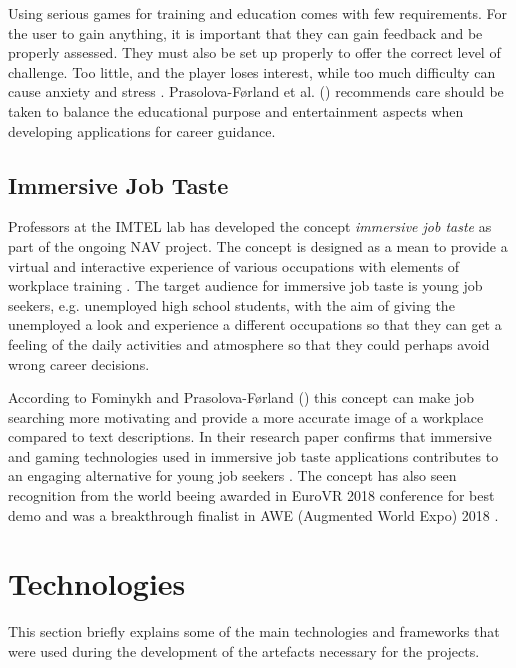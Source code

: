 Using serious games for training and education comes with few requirements. For the user to gain anything, it is important that they can gain feedback and be properly assessed. They must also be set up properly to offer the correct level of challenge. Too little, and the player loses interest, while too much difficulty can cause anxiety and stress \cite{de2014serious}. Prasolova-Førland et al. (\citeyear{prasolova2019empowering}) recommends care should be taken to balance the educational purpose and entertainment aspects when developing applications for career guidance.

\subsection{Immersive Job Taste}
Professors at the IMTEL lab has developed the concept \textit{immersive job taste} as part of the ongoing NAV  project. The concept is designed as a mean to provide a virtual and interactive experience of various occupations with elements of workplace training \cite{fominykh2019immersive}. The target audience for immersive job taste is  young job seekers, e.g. unemployed high school students, with the aim of giving the unemployed a look and experience a different occupations so that they can get a feeling of the daily activities and atmosphere so that they could perhaps avoid wrong career decisions. 

According to Fominykh and Prasolova-Førland (\citeyear{fominykh2019immersive}) this concept can make job searching more motivating and provide a more accurate image of a workplace compared to text descriptions. In their research paper confirms that immersive and gaming technologies used in immersive job taste applications contributes to an engaging alternative for young job seekers \cite{fominykh2019immersive}. The concept has also seen recognition from the world beeing awarded in EuroVR 2018 conference for best demo \cite{euroVR} and was a breakthrough finalist in AWE (Augmented World Expo) 2018 \cite{aweAwards}.



\section{Technologies}
\label{sec:technologies}
This section briefly explains some of the main technologies and frameworks that were used during the development of the artefacts necessary for the projects. 

